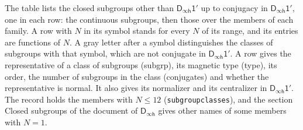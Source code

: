\documentclass[10pt,a4paper]{article}
\numberwithin{equation}{section}
\newcommand{\grp}[1]{\mathsf{#1}}
\begin{document}
\begin{center}
\end{center}
The table lists the closed subgroups other than $\grp{D_{\infty h}1'}$ up to conjugacy in $\grp{D_{\infty h}1'}$, one in each row: the continuous subgroups, then those over the members of each family. \label{n:index.family.N}A row with $N$ in its symbol stands for every $N$ of its range, and its entries are functions of $N$. \label{n:mark.letter}A gray letter after a symbol distinguishes the classes of subgroups with that symbol, which are not conjugate in $\grp{D_{\infty h}1'}$. \label{n:head.subgroup}\label{n:head.magnetic.type}\label{n:head.order}\label{n:head.conjugates}\label{n:head.normal}A row gives the representative of a class of subgroups (subgrp), its magnetic type (type), its order, the number of subgroups in the class (conjugates) and whether the representative is normal. \label{n:head.normalizer}\label{n:head.centralizer}It also gives its normalizer and its centralizer in $\grp{D_{\infty h}1'}$. The record holds the members with $N \le 12$ (\texttt{subgroupclasses}), and the section Closed subgroups of the document of \href{../../../rotation/data/pdf/Dinfh.pdf}{$\grp{D_{\infty h}}$} gives other names of some members with $N = 1$.
\end{document}
